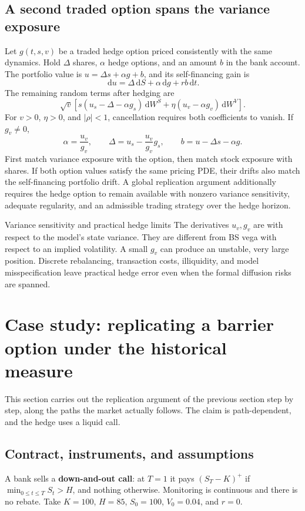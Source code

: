 \documentclass[10pt]{article}
\newcommand{\dd}{\,\mathrm d}\newcommand{\Pp}{\mathbb P}\newcommand{\Var}{\operatorname{Var}}\newcommand{\Cov}{\operatorname{Cov}}
\theoremstyle{definition}\newtheorem{definition}{Definition}[section]
\begin{document}
\subsection{A second traded option spans the variance exposure}
Let \(g(t,s,v)\) be a traded hedge option priced consistently with the
same dynamics. Hold \(\Delta\) shares, \(\alpha\) hedge options, and
an amount \(b\) in the bank account. The portfolio value is
\(u=\Delta s+\alpha g+b\), and its self-financing gain is
\[
\dd u=\Delta\dd S+\alpha\dd g+rb\dd t.
\]
The remaining random terms after hedging are
\[
\sqrt v\left[s(u_s-\Delta-\alpha g_s)\dd W^S
+\eta(u_v-\alpha g_v)\dd W^V\right].
\]
For \(v>0\), \(\eta>0\), and \(|\rho|<1\), cancellation requires both
coefficients to vanish. If \(g_v\ne0\),
\[
\boxed{\alpha=\frac{u_v}{g_v},\qquad
\Delta=u_s-\frac{u_v}{g_v}g_s,\qquad
b=u-\Delta s-\alpha g.}
\]
First match variance exposure with the option, then match stock exposure
with shares. If both option values satisfy the same pricing PDE, their
drifts also match the self-financing portfolio drift. A global replication
argument additionally requires the hedge option to remain available with
nonzero variance sensitivity, adequate regularity, and an admissible
trading strategy over the hedge horizon.

\begin{warningbox}{Variance sensitivity and practical hedge limits}
The derivatives \(u_v,g_v\) are with respect to the model's state variance.
They are different from BS vega with respect to an implied volatility.
A small \(g_v\) can produce an unstable, very large position. Discrete
rebalancing, transaction costs, illiquidity, and model misspecification
leave practical hedge error even when the formal diffusion risks are spanned.
\end{warningbox}

\section{Case study: replicating a barrier option under the historical measure}\label{sec:barrier}
This section carries out the replication argument of the previous section
step by step, along the paths the market actually follows. The claim is
path-dependent, and the hedge uses a liquid call.

\subsection{Contract, instruments, and assumptions}
A bank sells a \textbf{down-and-out call}: at \(T=1\) it pays
\((S_T-K)^+\) if \(\min_{0\leq t\leq T}S_t>H\), and nothing otherwise.
Monitoring is continuous and there is no rebate. Take \(K=100\), \(H=85\),
\(S_0=100\), \(V_0=0.04\), and \(r=0\).
\end{document}
